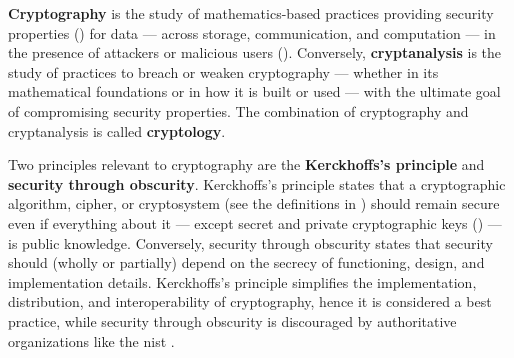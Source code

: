 \textbf{Cryptography} is the study of mathematics-based practices providing security properties () for data --- across storage, communication, and computation --- in the presence of attackers or malicious users (). Conversely, \textbf{cryptanalysis} is the study of practices to breach or weaken cryptography --- whether in its mathematical foundations or in how it is built or used --- with the ultimate goal of compromising security properties. The combination of cryptography and cryptanalysis is called \textbf{cryptology}.


Two principles relevant to cryptography are the \textbf{Kerckhoffs's principle} and \textbf{security through obscurity}. Kerckhoffs's principle states that a cryptographic algorithm, cipher, or cryptosystem (see the definitions in ) should remain secure even if everything about it --- except secret and private cryptographic keys () --- is public knowledge. Conversely, security through obscurity states that security should (wholly or partially) depend on the secrecy of functioning, design, and implementation details. Kerckhoffs's principle simplifies the implementation, distribution, and interoperability of cryptography, hence it is considered a best practice, while security through obscurity is discouraged by authoritative organizations like the \gls{nist} \cite{scarfone_guide_2008}.

